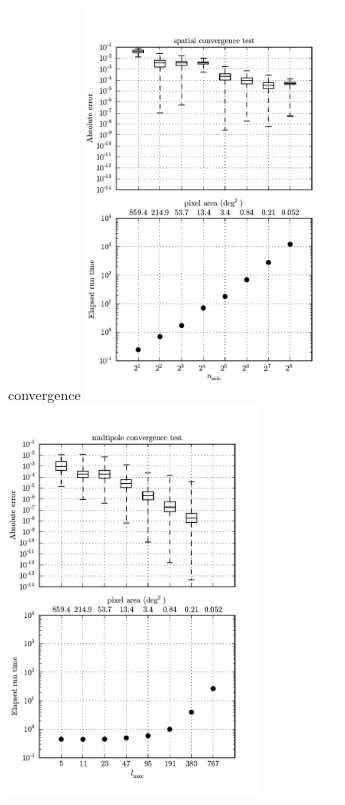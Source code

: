 \documentclass[landscape]{a0poster}
\begin{document}
\begin{staticcontents*}{convergence}
\includegraphics[width=0.5\textwidth]{spatial}
\includegraphics[width=0.5\textwidth]{multipole}
\end{staticcontents*}
\end{document}
